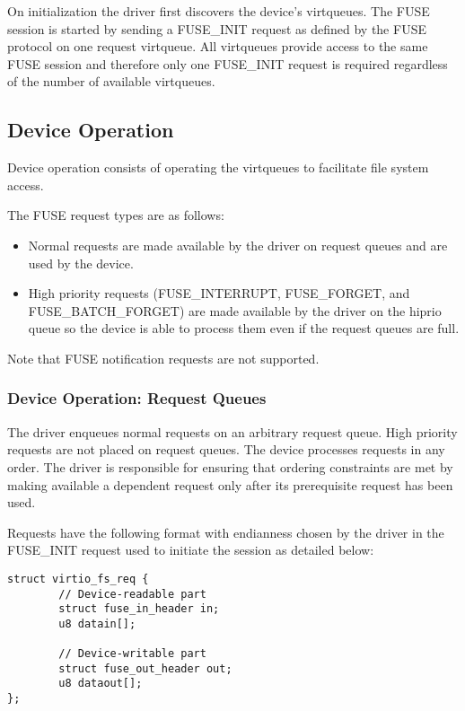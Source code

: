 On initialization the driver first discovers the device's virtqueues.  The FUSE
session is started by sending a FUSE\_INIT request as defined by the FUSE
protocol on one request virtqueue.  All virtqueues provide access to the same
FUSE session and therefore only one FUSE\_INIT request is required regardless
of the number of available virtqueues.

\subsection{Device Operation}\label{sec:Device Types / File System Device / Device Operation}

Device operation consists of operating the virtqueues to facilitate file system
access.

The FUSE request types are as follows:
\begin{itemize}
\item Normal requests are made available by the driver on request queues and
      are used by the device.
\item High priority requests (FUSE\_INTERRUPT, FUSE\_FORGET, and
      FUSE\_BATCH\_FORGET) are made available by the driver on the hiprio queue
      so the device is able to process them even if the request queues are
      full.
\end{itemize}

Note that FUSE notification requests are not supported.

\subsubsection{Device Operation: Request Queues}\label{sec:Device Types / File System Device / Device Operation / Device Operation: Request Queues}

The driver enqueues normal requests on an arbitrary request queue. High
priority requests are not placed on request queues.  The device processes
requests in any order.  The driver is responsible for ensuring that ordering
constraints are met by making available a dependent request only after its
prerequisite request has been used.

Requests have the following format with endianness chosen by the driver in the
FUSE\_INIT request used to initiate the session as detailed below:

\begin{lstlisting}
struct virtio_fs_req {
        // Device-readable part
        struct fuse_in_header in;
        u8 datain[];

        // Device-writable part
        struct fuse_out_header out;
        u8 dataout[];
};
\end{lstlisting}

